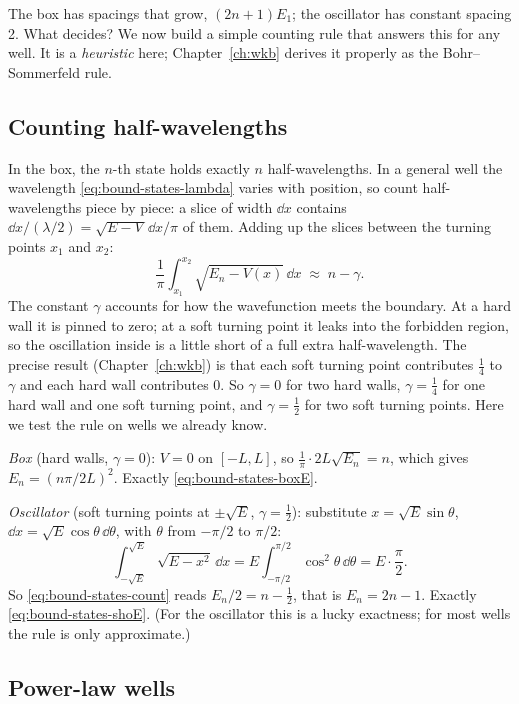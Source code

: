 The box has spacings that grow, $(2n+1)E_1$; the oscillator has constant spacing 2. What decides? We now build a simple counting rule that answers this for any well. It is a \emph{heuristic} here; Chapter~\ref{ch:wkb} derives it properly as the Bohr--Sommerfeld rule.

\subsection{Counting half-wavelengths}

In the box, the $n$-th state holds exactly $n$ half-wavelengths. In a general well the wavelength \cref{eq:bound-states-lambda} varies with position, so count half-wavelengths piece by piece: a slice of width $\dd x$ contains $\dd x/(\lambda/2)=\sqrt{E-V}\,\dd x/\pi$ of them. Adding up the slices between the turning points $x_1$ and $x_2$:
\begin{equation}
\frac1\pi\int_{x_1}^{x_2}\sqrt{E_n-V(x)}\,\dd x\;\approx\;n-\gamma .
\label{eq:bound-states-count}
\end{equation}
The constant $\gamma$ accounts for how the wavefunction meets the boundary. At a hard wall it is pinned to zero; at a soft turning point it leaks into the forbidden region, so the oscillation inside is a little short of a full extra half-wavelength. The precise result (Chapter~\ref{ch:wkb}) is that each soft turning point contributes $\tfrac14$ to $\gamma$ and each hard wall contributes 0. So $\gamma=0$ for two hard walls, $\gamma=\tfrac14$ for one hard wall and one soft turning point, and $\gamma=\tfrac12$ for two soft turning points. Here we test the rule on wells we already know.

\emph{Box} (hard walls, $\gamma=0$): $V=0$ on $[-L,L]$, so $\frac1\pi\cdot2L\sqrt{E_n}=n$, which gives $E_n=(n\pi/2L)^2$. Exactly \cref{eq:bound-states-boxE}.

\emph{Oscillator} (soft turning points at $\pm\sqrt E$, $\gamma=\tfrac12$): substitute $x=\sqrt E\sin\theta$, $\dd x=\sqrt E\cos\theta\,\dd\theta$, with $\theta$ from $-\pi/2$ to $\pi/2$:
\[
\int_{-\sqrt E}^{\sqrt E}\sqrt{E-x^2}\,\dd x=E\int_{-\pi/2}^{\pi/2}\cos^2\theta\,\dd\theta=E\cdot\frac\pi2 .
\]
So \cref{eq:bound-states-count} reads $E_n/2=n-\tfrac12$, that is $E_n=2n-1$. Exactly \cref{eq:bound-states-shoE}. (For the oscillator this is a lucky exactness; for most wells the rule is only approximate.)

\subsection{Power-law wells}

